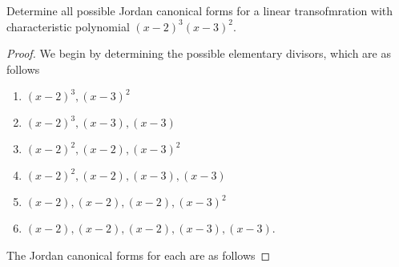 \documentclass[10pt]{amsart}
\begin{document}
\begin{thm}
  \label{Ex6}
  Determine all possible Jordan canonical forms for a linear transofmration with characteristic polynomial $(x-2)^3(x-3)^2$.
  \begin{proof}
    We begin by determining the possible elementary divisors, which are as follows
    \begin{enumerate}
    \item
      $(x-2)^3, (x-3)^2$
    \item
      $(x-2)^3, (x-3), (x-3)$
    \item
      $(x-2)^2, (x-2), (x-3)^2$
    \item
      $(x-2)^2, (x-2), (x-3), (x-3)$
    \item
      $(x-2), (x-2), (x-2), (x-3)^2$
    \item
      $(x-2), (x-2), (x-2), (x-3), (x-3)$.
    \end{enumerate}
    The Jordan canonical forms for each are as follows
\end{proof}
\end{thm}
\end{document}
